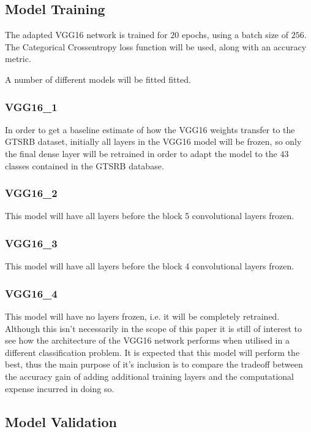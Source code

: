\documentclass[a4paper,11pt]{article}
\begin{document}
\subsection{Model Training}

The adapted VGG16 network is trained for $20$ epochs, using a batch size of $256$. The Categorical Crossentropy loss function will be used, along with an accuracy metric.

A number of different models will be fitted fitted. 

\subsubsection{VGG16\_1}

In order to get a baseline estimate of how the VGG16 weights transfer to the GTSRB dataset, initially all layers in the VGG16 model will be frozen, so only the final dense layer will be retrained in order to adapt the model to the $43$ classes contained in the GTSRB database.

\subsubsection{VGG16\_2}

This model will have all layers before the block 5 convolutional layers frozen.

\subsubsection{VGG16\_3}

This model will have all layers before the block 4 convolutional layers frozen.

\subsubsection{VGG16\_4}

This model will have no layers frozen, i.e. it will be completely retrained. Although this isn't necessarily in the scope of this paper it is still of interest to see how the architecture of the VGG16 network performs when utilised in a different classification problem. It is expected that this model will perform the best, thus the main purpose of it's inclusion is to compare the tradeoff between the accuracy gain of adding additional training layers and the computational expense incurred in doing so.

\subsection{Model Validation}	
\end{document}
